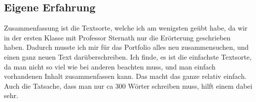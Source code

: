 \subsection{Eigene Erfahrung}
Zusammenfassung ist die Textsorte, welche ich am wenigsten geübt habe, da wir in der ersten Klasse mit Professor Sternath nur die Erörterung geschrieben haben. Dadurch musste ich mir für das Portfolio alles neu zusammensuchen, und einen ganz neuen Text darüberschreiben. Ich finde, es ist die einfachste Textsorte, da man nicht so viel wie bei anderen beachten muss, und man einfach vorhandenen Inhalt zusammenfassen kann. Das macht das ganze relativ einfach. Auch die Tatsache, dass man nur ca 300 Wörter schreiben muss, hilft einem dabei sehr.  
